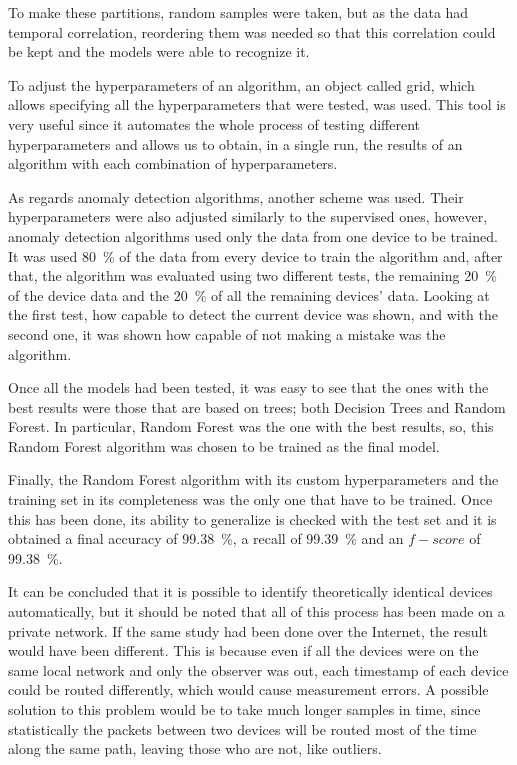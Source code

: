 To make these partitions, random samples were taken, but as the data had temporal correlation, reordering them was needed so that this correlation could be kept and the models were able to recognize it. 

To adjust the hyperparameters of an algorithm, an object called grid, which allows specifying all the hyperparameters that were tested, was used. This tool is very useful since it automates the whole process of testing different hyperparameters and allows us to obtain, in a single run, the results of an algorithm with each combination of hyperparameters.

As regards anomaly detection algorithms, another scheme was used. Their hyperparameters were also adjusted similarly to the supervised ones, however, anomaly detection algorithms used only the data from one device to be trained. It was used \SI{80}{\percent} of the data from every device to train the algorithm and, after that, the algorithm was evaluated using two different tests, the remaining \SI{20}{\percent} of the device data and the \SI{20}{\percent} of all the remaining devices' data. Looking at the first test, how capable to detect the current device was shown, and with the second one, it was shown how capable of not making a mistake was the algorithm.


Once all the models had been tested, it was easy to see that the ones with the best results were those that are based on trees; both Decision Trees and Random Forest.  In particular, Random Forest was the one with the best results, so, this Random Forest algorithm was chosen to be trained as the final model. 

Finally, the Random Forest algorithm with its custom hyperparameters and the training set in its completeness was the only one that have to be trained. Once this has been done, its ability to generalize is checked with the test set and it is obtained a final accuracy of \SI{99.38}{\percent}, a recall of \SI{99.39}{\percent} and an $f-score$ of \SI{99.38}{\percent}.


It can be concluded that it is possible to identify theoretically identical devices automatically, but it should be noted that all of this process has been made on a private network. If the same study had been done over the Internet, the result would have been different. This is because even if all the devices were on the same local network and only the observer was out, each timestamp of each device could be routed differently, which would cause measurement errors. A possible solution to this problem would be to take much longer samples in time, since statistically the packets between two devices will be routed most of the time along the same path, leaving those who are not, like outliers. 

